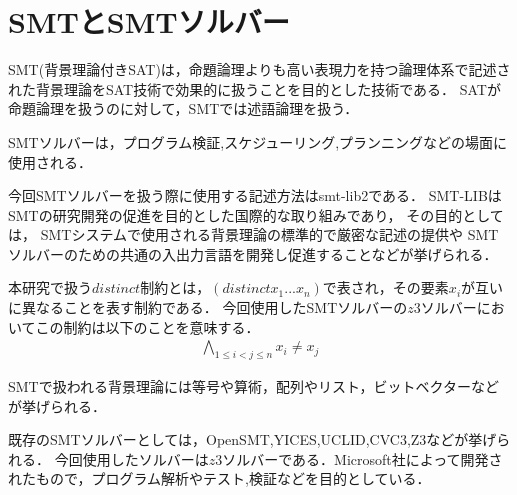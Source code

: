 \chapter{SMTとSMTソルバー}\label{chap:smt}

%
%
SMT(背景理論付きSAT)は，命題論理よりも高い表現力を持つ論理体系で記述された背景理論をSAT技術で効果的に扱うことを目的とした技術である．
SATが命題論理を扱うのに対して，SMTでは述語論理を扱う\cite{JSAI:IwanumaN10}．

%
%
SMTソルバーは，プログラム検証,スケジューリング,プランニングなどの場面に使用される．


今回SMTソルバーを扱う際に使用する記述方法はsmt-lib2である．
SMT-LIBはSMTの研究開発の促進を目的とした国際的な取り組みであり，
その目的としては，
SMTシステムで使用される背景理論の標準的で厳密な記述の提供や
SMTソルバーのための共通の入出力言語を開発し促進することなどが挙げられる．


本研究で扱う$distinct$制約とは，$(distinct x_1 ... x_n)$で表され，その要素$x_i$が互いに異なることを表す制約である．
今回使用したSMTソルバーの$z3ソルバー$においてこの制約は以下のことを意味する．
\begin{eqnarray*}
    \bigwedge_{1 \leq i < j \leq n} x_i \neq x_j
\end{eqnarray*}


SMTで扱われる背景理論には等号や算術，配列やリスト，ビットベクターなどが挙げられる．

既存のSMTソルバーとしては，OpenSMT,YICES,UCLID,CVC3,Z3などが挙げられる．
今回使用したソルバーは$z3ソルバー$である．Microsoft社によって開発されたもので，プログラム解析やテスト,検証などを目的としている\cite{Umemura10:jssst}．



